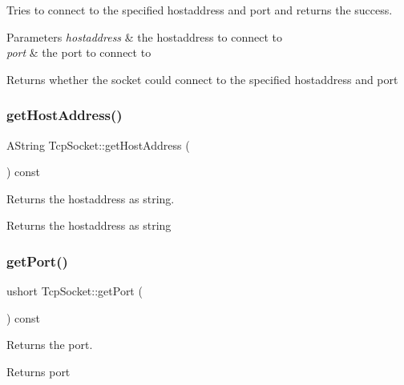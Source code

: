 Tries to connect to the specified hostaddress and port and returns the success. 


\begin{DoxyParams}{Parameters}
{\em hostaddress} & the hostaddress to connect to \\
\hline
{\em port} & the port to connect to \\
\hline
\end{DoxyParams}
\begin{DoxyReturn}{Returns}
whether the socket could connect to the specified hostaddress and port 
\end{DoxyReturn}
\mbox{\label{class_tcp_socket_a1638a4368afb26acee666ea497ba737e}} 
\subsubsection{\texorpdfstring{getHostAddress()}{getHostAddress()}}
{\footnotesize\ttfamily A\+String Tcp\+Socket\+::get\+Host\+Address (\begin{DoxyParamCaption}{ }\end{DoxyParamCaption}) const}



Returns the hostaddress as string. 

\begin{DoxyReturn}{Returns}
the hostaddress as string 
\end{DoxyReturn}
\mbox{\label{class_tcp_socket_aae788fccc721be52ff85c0fcbb1424c5}} 
\subsubsection{\texorpdfstring{getPort()}{getPort()}}
{\footnotesize\ttfamily ushort Tcp\+Socket\+::get\+Port (\begin{DoxyParamCaption}{ }\end{DoxyParamCaption}) const}



Returns the port. 

\begin{DoxyReturn}{Returns}
port 
\end{DoxyReturn}
\mbox{\label{class_tcp_socket_af08fd94259257c41adcc7b3722574dc6}} 
